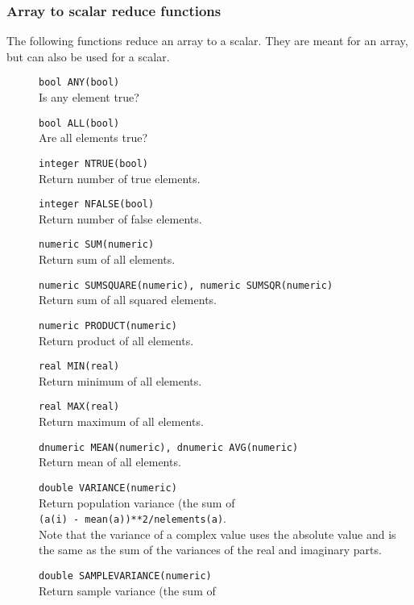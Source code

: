 \subsubsection{Array to scalar reduce functions}
The following functions reduce an array to a scalar.
They are meant for an array, but can also be used for a scalar.
\begin{description}
  \item[] \texttt{bool ANY(bool)}\\
    Is any element true?
  \item[] \texttt{bool ALL(bool)}\\
    Are all elements true?
  \item[] \texttt{integer NTRUE(bool)}\\
    Return number of true elements.
  \item[] \texttt{integer NFALSE(bool)}\\
    Return number of false elements.
  \item[] \texttt{numeric SUM(numeric)}\\
    Return sum of all elements.
  \item[] \texttt{numeric SUMSQUARE(numeric), numeric SUMSQR(numeric)}\\
    Return sum of all squared elements.
  \item[] \texttt{numeric PRODUCT(numeric)}\\
    Return product of all elements.
  \item[] \texttt{real MIN(real)}\\
    Return minimum of all elements.
  \item[] \texttt{real MAX(real)}\\
    Return maximum of all elements.
  \item[] \texttt{dnumeric MEAN(numeric), dnumeric AVG(numeric)}\\
    Return mean of all elements.
  \item[] \texttt{double VARIANCE(numeric)}\\
    Return population variance (the sum of
    \\\texttt{(a(i) - mean(a))**2/nelements(a)}.
    \\Note that the variance of a complex value uses the absolute
    value and is the same as the sum of the
    variances of the real and imaginary parts. 
  \item[] \texttt{double SAMPLEVARIANCE(numeric)}\\
    Return sample variance (the sum of

\end{description}
